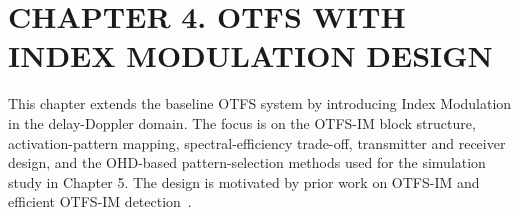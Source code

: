 \section*{CHAPTER 4. OTFS WITH INDEX MODULATION DESIGN}

\setcounter{section}{4}
\setcounter{subsection}{0}
\setcounter{subsubsection}{0}
\setcounter{figure}{0}
\setcounter{table}{0}
\setcounter{equation}{0}

\renewcommand{\thefigure}{4.\arabic{figure}}
\renewcommand{\thetable}{4.\arabic{table}}
\renewcommand{\theequation}{4.\arabic{equation}}
\renewcommand{\theHfigure}{4.\arabic{figure}}
\renewcommand{\theHtable}{4.\arabic{table}}
\renewcommand{\theHequation}{4.\arabic{equation}}

This chapter extends the baseline OTFS system by introducing Index Modulation in the delay-Doppler domain. The focus is on the OTFS-IM block structure, activation-pattern mapping, spectral-efficiency trade-off, transmitter and receiver design, and the OHD-based pattern-selection methods used for the simulation study in Chapter 5. The design is motivated by prior work on OTFS-IM and efficient OTFS-IM detection~\cite{Liang2020OTFSIM,Wu2024OTFSIMDetector,Qian2022BlockWiseOTFSIM,Qian2023ReceiverOTFSIM}.















\newpage
